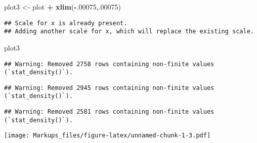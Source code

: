 \documentclass[
]{article}
\newenvironment{Shaded}{\begin{snugshade}}{\end{snugshade}}
\newcommand{\DecValTok}[1]{\textcolor[rgb]{0.00,0.00,0.81}{#1}}
\newcommand{\FunctionTok}[1]{\textcolor[rgb]{0.13,0.29,0.53}{\textbf{#1}}}
\newcommand{\NormalTok}[1]{#1}
\newcommand{\OtherTok}[1]{\textcolor[rgb]{0.56,0.35,0.01}{#1}}
\newcommand{\SpecialCharTok}[1]{\textcolor[rgb]{0.81,0.36,0.00}{\textbf{#1}}}
\begin{document}
\begin{Shaded}
\begin{Highlighting}[]
\NormalTok{plot3 }\OtherTok{\textless{}{-}}\NormalTok{ plot }\SpecialCharTok{+} \FunctionTok{xlim}\NormalTok{(}\SpecialCharTok{{-}}\NormalTok{.}\DecValTok{00075}\NormalTok{,.}\DecValTok{00075}\NormalTok{)}
\end{Highlighting}
\end{Shaded}

\begin{verbatim}
## Scale for x is already present.
## Adding another scale for x, which will replace the existing scale.
\end{verbatim}

\begin{Shaded}
\begin{Highlighting}[]
\NormalTok{plot3}
\end{Highlighting}
\end{Shaded}

\begin{verbatim}
## Warning: Removed 2758 rows containing non-finite values (`stat_density()`).
\end{verbatim}

\begin{verbatim}
## Warning: Removed 2945 rows containing non-finite values (`stat_density()`).
\end{verbatim}

\begin{verbatim}
## Warning: Removed 2581 rows containing non-finite values (`stat_density()`).
\end{verbatim}

\texttt{[image: Markups\_files/figure-latex/unnamed-chunk-1-3.pdf]}
\end{document}
